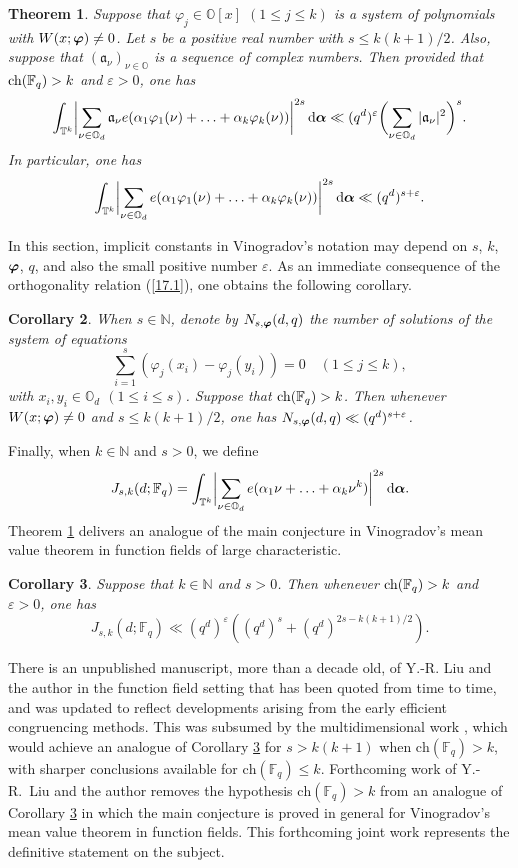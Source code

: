 \documentclass[12pt,reqno]{amsart}
\newtheorem{theorem}{Theorem}[section]
\newtheorem{corollary}[theorem]{Corollary}
\theoremstyle{definition}
\theoremstyle{remark}
\numberwithin{equation}{section}
\def\dbF{{\mathbb F}}\def\dbK{{\mathbb K}}
\def\dbN{{\mathbb N}} \def\dbO{{\mathbb O}} \def\dbP{{\mathbb P}}
\def\gra{{\mathfrak a}}\def\grA{{\mathfrak A}}\def\bfgra{{\boldsymbol \gra}}
\def\alp{{\alpha}} \def\bfalp{{\boldsymbol \alpha}}
\def\eps{\varepsilon}
\def\le{\leqslant} \def\ge{\geqslant} \def\pleq{\preccurlyeq} \def\ple{\prec}
\def\d{{\,{\rm d}}}
\begin{document}
\begin{theorem}\label{theorem17.1} Suppose that $\varphi_j\in \dbO[x]$ $(1\le j\le k)$ is a 
system of polynomials with $W(x;{\boldsymbol \varphi})\ne 0$. Let $s$ be a positive real number with 
$s\le k(k+1)/2$. Also, suppose that $(\gra_\nu)_{\nu\in \dbO}$ is a sequence of complex 
numbers. Then provided that ${\rm ch}(\dbF_q)>k$ and $\eps>0$, one has
$$\int_{\dbT^k}\biggl| \sum_{\nu\in \dbO_d}\gra_\nu e(\alp_1\varphi_1(\nu)+\ldots 
+\alp_k\varphi_k(\nu))\biggr|^{2s}\d\bfalp \ll (q^d)^\eps \biggl( \sum_{\nu \in 
\dbO_d}|\gra_\nu|^2\biggr)^s.$$
In particular, one has
$$\int_{\dbT^k}\biggl| \sum_{\nu\in \dbO_d}e(\alp_1\varphi_1(\nu)+\ldots 
+\alp_k\varphi_k(\nu))\biggr|^{2s}\d\bfalp \ll (q^d)^{s+\eps }.$$
\end{theorem}

In this section, implicit constants in Vinogradov's notation may depend on $s$, $k$, 
${\boldsymbol \varphi}$, $q$, and also the small positive number $\eps$. As an immediate consequence 
of the orthogonality relation (\ref{17.1}), one obtains the following corollary.

\begin{corollary}\label{corollary} When $s\in \dbN$, denote by $N_{s,{\boldsymbol \varphi}}(d,q)$ 
the number of solutions of the system of equations
$$\sum_{i=1}^s (\varphi_j(x_i)-\varphi_j(y_i))=0\quad (1\le j\le k),$$
with $x_i,y_i\in \dbO_d$ $(1\le i\le s)$. Suppose that ${\rm ch}(\dbF_q)>k$. Then 
whenever $W(x;{\boldsymbol \varphi})\ne 0$ and $s\le k(k+1)/2$, one has 
$N_{s,\bfvarphi}(d,q)\ll (q^d)^{s+\eps}$.
\end{corollary}

Finally, when $k\in \dbN$ and $s>0$, we define
$$J_{s,k}(d;\dbF_q)=\int_{\dbT^k}\biggl| \sum_{\nu\in \dbO_d}e(\alp_1\nu+\ldots 
+\alp_k\nu^k)\biggr|^{2s}\d\bfalp .$$
Theorem \ref{theorem17.1} delivers an analogue of the main conjecture in Vinogradov's 
mean value theorem in function fields of large characteristic.

\begin{corollary}\label{corollary17.3}
Suppose that $k\in \dbN$ and $s>0$. Then whenever ${\rm ch}(\dbF_q)>k$ and $\eps>0$, 
one has
$$J_{s,k}(d;\dbF_q)\ll (q^d)^\eps \left( (q^d)^s+(q^d)^{2s-k(k+1)/2}\right) .$$
\end{corollary}

There is an unpublished manuscript, more than a decade old, of Y.-R. Liu and the author in 
the function field setting that has been quoted from time to time, and was updated to 
reflect developments arising from the early efficient congruencing methods. This was 
subsumed by the multidimensional work \cite{KLZ2014}, which would achieve an analogue 
of Corollary \ref{corollary17.3} for $s>k(k+1)$ when $\text{ch}(\dbF_q)>k$, with sharper 
conclusions available for $\text{ch}(\dbF_q)\le k$. Forthcoming work of Y.-R.~Liu and the 
author removes the hypothesis $\text{ch}(\dbF_q)>k$ from an analogue of Corollary 
\ref{corollary17.3} in which the main conjecture is proved in general for Vinogradov's mean 
value theorem in function fields. This forthcoming joint work represents the definitive 
statement on the subject.\par
\end{document}
